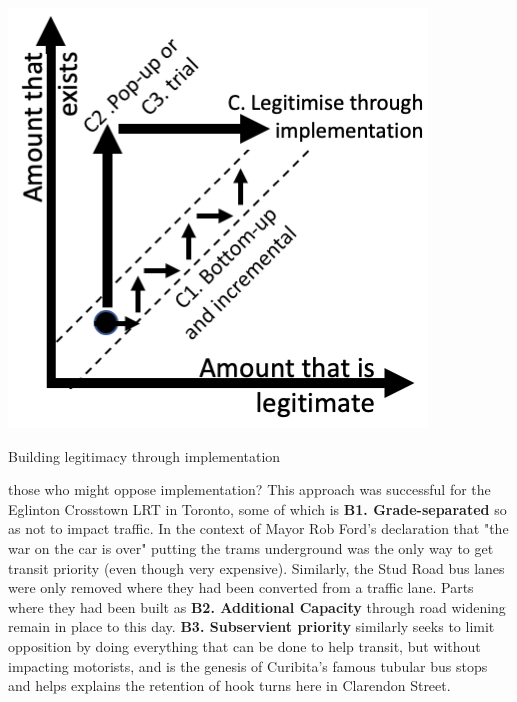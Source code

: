 \documentclass{tufte-handout}
\begin{document}
\begin{marginfigure}%
  \includegraphics[width=\linewidth]{Figure4}
  \caption{Building legitimacy through implementation}
  \label{fig:FIgure4}
\end{marginfigure}







 those who might oppose implementation?  This approach was successful for the Eglinton Crosstown LRT in Toronto, some of which is \textbf{B1. Grade-separated} so as not to impact traffic. In the context of Mayor Rob Ford's declaration that "the war on the car is over" putting the trams underground was the only way to get transit priority (even though very expensive). Similarly,  the Stud Road bus lanes were only removed where they had been converted from a traffic lane. Parts where they had been built as \textbf{B2. Additional Capacity} through road widening remain in place to this day.  \textbf{B3. Subservient priority} similarly seeks to limit opposition  by doing everything that can be done to help transit, but without impacting motorists, and is the genesis of Curibita's famous tubular bus stops and helps explains the retention of hook turns here in Clarendon Street. 
\end{document}
